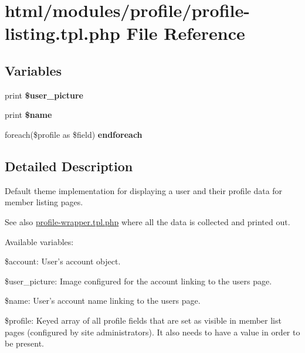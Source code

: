 \hypertarget{profile-listing_8tpl_8php}{
\section{html/modules/profile/profile-\/listing.tpl.php File Reference}
\label{profile-listing_8tpl_8php}
}
\subsection*{Variables}
\begin{DoxyCompactItemize}
\item 
\hypertarget{profile-listing_8tpl_8php_a2662269aca0f9faedd1ee9e41828ea4c}{
print {\bfseries \$user\_\-picture}}
\label{profile-listing_8tpl_8php_a2662269aca0f9faedd1ee9e41828ea4c}

\item 
\hypertarget{profile-listing_8tpl_8php_a3b6a989206ad4aa65f2a35310530d052}{
print {\bfseries \$name}}
\label{profile-listing_8tpl_8php_a3b6a989206ad4aa65f2a35310530d052}

\item 
\hypertarget{profile-listing_8tpl_8php_a786bc7397fe2b18f739bbd3f5a92ff47}{
foreach(\$profile as \$field) {\bfseries endforeach}}
\label{profile-listing_8tpl_8php_a786bc7397fe2b18f739bbd3f5a92ff47}

\end{DoxyCompactItemize}


\subsection{Detailed Description}
Default theme implementation for displaying a user and their profile data for member listing pages.

\begin{DoxySeeAlso}{See also}
\hyperlink{profile-wrapper_8tpl_8php}{profile-\/wrapper.tpl.php} where all the data is collected and printed out.
\end{DoxySeeAlso}
Available variables:
\begin{DoxyItemize}
\item \$account: User's account object.
\item \$user\_\-picture: Image configured for the account linking to the users page.
\item \$name: User's account name linking to the users page.
\item \$profile: Keyed array of all profile fields that are set as visible in member list pages (configured by site administrators). It also needs to have a value in order to be present.
\end{DoxyItemize}

